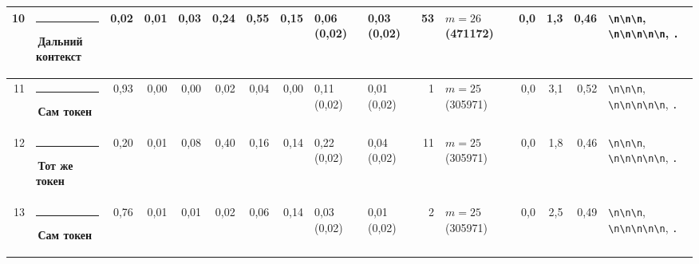 \documentclass[10pt]{article}
\begin{document}
\begin{minipage}{\linewidth}
\begin{center}
{\begin{tabular}{|r|l|r|r|r|r|r|r|l|l|r|l|r|r|r|l|}
10 & \textcolor[HTML]{C3C2B7}{\rule{0.62em}{0.62em}}\,Дальний контекст & 0,02 & 0,01 & 0,03 & 0,24 & 0,55 & 0,15 & 0,06 (0,02) & 0,03 (0,02) & 53 & $m{=}26$ (471172) & 0,0 & 1,3 & 0,46 & \texttt{\textvisiblespace{}\textbackslash{}n\textbackslash{}n\textbackslash{}n}, \texttt{\textbackslash{}n\textbackslash{}n\textbackslash{}n\textbackslash{}n\textbackslash{}n}, \texttt{\textvisiblespace{}.} \\ \hline
11 & \textcolor[HTML]{2A78D6}{\rule{0.62em}{0.62em}}\,\textbf{Сам токен} & 0,93 & 0,00 & 0,00 & 0,02 & 0,04 & 0,00 & 0,11 (0,02) & 0,01 (0,02) & 1 & $m{=}25$ (305971) & 0,0 & 3,1 & 0,52 & \texttt{\textvisiblespace{}\textbackslash{}n\textbackslash{}n\textbackslash{}n}, \texttt{\textbackslash{}n\textbackslash{}n\textbackslash{}n\textbackslash{}n\textbackslash{}n}, \texttt{\textvisiblespace{}.} \\ \hline
12 & \textcolor[HTML]{E87BA4}{\rule{0.62em}{0.62em}}\,\textbf{Тот же токен} & 0,20 & 0,01 & 0,08 & 0,40 & 0,16 & 0,14 & 0,22 (0,02) & 0,04 (0,02) & 11 & $m{=}25$ (305971) & 0,0 & 1,8 & 0,46 & \texttt{\textvisiblespace{}\textbackslash{}n\textbackslash{}n\textbackslash{}n}, \texttt{\textbackslash{}n\textbackslash{}n\textbackslash{}n\textbackslash{}n\textbackslash{}n}, \texttt{\textvisiblespace{}.} \\ \hline
13 & \textcolor[HTML]{2A78D6}{\rule{0.62em}{0.62em}}\,\textbf{Сам токен} & 0,76 & 0,01 & 0,01 & 0,02 & 0,06 & 0,14 & 0,03 (0,02) & 0,01 (0,02) & 2 & $m{=}25$ (305971) & 0,0 & 2,5 & 0,49 & \texttt{\textvisiblespace{}\textbackslash{}n\textbackslash{}n\textbackslash{}n}, \texttt{\textbackslash{}n\textbackslash{}n\textbackslash{}n\textbackslash{}n\textbackslash{}n}, \texttt{\textvisiblespace{}.} \\ \hline
\hline\end{tabular}}\end{center}
\end{minipage}
\par\vspace{0.4em}
\end{document}
